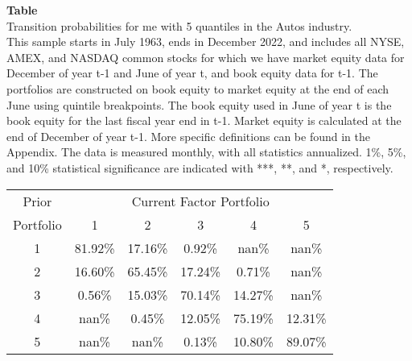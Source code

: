 \begin{table*}[ht!]
\raggedright
{}
\label{tab: transition_probs_me_Autos_with_5_quantiles}
\textbf{Table \thetable} \\
Transition probabilities for me with 5 quantiles in the Autos industry. \\
\hspace*{1em}This sample starts in July 1963, ends in December 2022, and includes all NYSE, AMEX, and NASDAQ common stocks for which we have market equity data for December of year t-1 and June of year t, and book equity data for t-1. The portfolios are constructed on book equity to market equity at the end of each June using quintile breakpoints.  The book equity used in June of year t is the book equity for the last fiscal year end in t-1.  Market equity is calculated at the end of December of year t-1.  More specific definitions can be found in the Appendix.  The data is measured monthly, with all statistics annualized.  1\%, 5\%, and 10\% statistical significance are indicated with ***, **, and *, respectively. \\
\vspace{0.5em}
\centering
\begin{adjustbox}{max width=\textwidth}
\begin{tabular}{@{}cccccc@{}}
\toprule
Prior & \multicolumn{5}{c}{Current Factor Portfolio} \\
Portfolio & 1 & 2 & 3 & 4 & 5 \\
\midrule
1 & 81.92\% & 17.16\% & 0.92\% & nan\% & nan\% \\
2 & 16.60\% & 65.45\% & 17.24\% & 0.71\% & nan\% \\
3 & 0.56\% & 15.03\% & 70.14\% & 14.27\% & nan\% \\
4 & nan\% & 0.45\% & 12.05\% & 75.19\% & 12.31\% \\
5 & nan\% & nan\% & 0.13\% & 10.80\% & 89.07\% \\
\bottomrule
\end{tabular}
\end{adjustbox}
\end{table*}